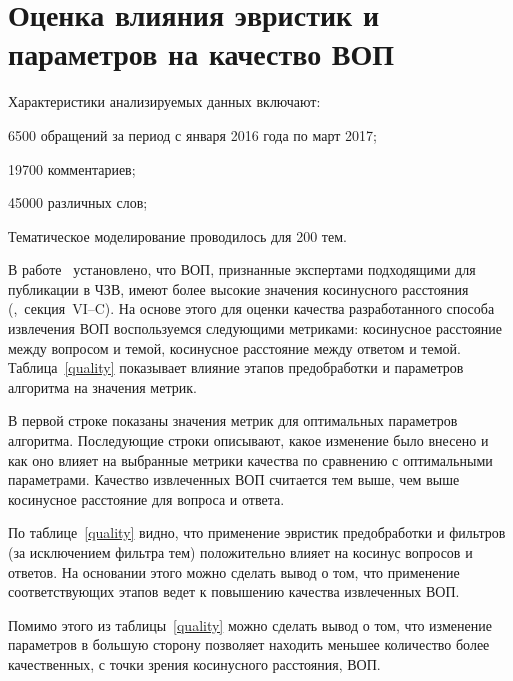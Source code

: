 \section{Оценка влияния эвристик и параметров на качество ВОП}

Характеристики анализируемых данных включают:

\begin{itemize*}
\item 6500 обращений за период с января 2016 года по март 2017;
\item 19700 комментариев;
\item 45000 различных слов;
\item Тематическое моделирование проводилось для 200 тем.
\end{itemize*}

В работе~\cite{original} установлено, что ВОП, признанные экспертами подходящими для публикации в ЧЗВ, имеют более высокие значения косинусного расстояния (\cite{original},~секция~VI--C). На основе этого для оценки качества разработанного способа извлечения ВОП воспользуемся следующими метриками: косинусное расстояние между вопросом и темой, косинусное расстояние между ответом и темой. Таблица~\ref{quality} показывает влияние этапов предобработки и параметров алгоритма на значения метрик. 

В первой строке показаны значения метрик для оптимальных параметров алгоритма. Последующие строки описывают, какое изменение было внесено и как оно влияет на выбранные метрики качества по сравнению с оптимальными параметрами. Качество извлеченных ВОП считается тем выше, чем выше косинусное расстояние для вопроса и ответа.

По таблице~\ref{quality} видно, что применение эвристик предобработки и фильтров (за исключением фильтра тем) положительно влияет на косинус вопросов и ответов. На основании этого можно сделать вывод о том, что применение соответствующих этапов ведет к повышению качества извлеченных ВОП. 

Помимо этого из таблицы~\ref{quality} можно сделать вывод о том, что изменение параметров в большую сторону позволяет находить меньшее количество более качественных, с точки зрения косинусного расстояния, ВОП. 

